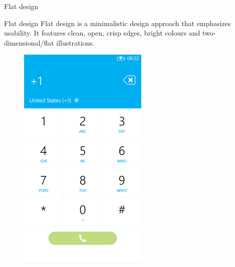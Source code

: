 \documentclass{beamer}
\begin{document}
\begin{frame}{Flat design}
\begin{block}{Flat design}
Flat design is a minimalistic design approach that emphasizes usability. It features clean, open, crisp edges, bright colours and two-dimensional/flat illustrations.
\end{block}
\begin{figure}
\includegraphics[scale=0.35]{dial-flat.png}
\end{figure}

\end{frame}
\end{document}
